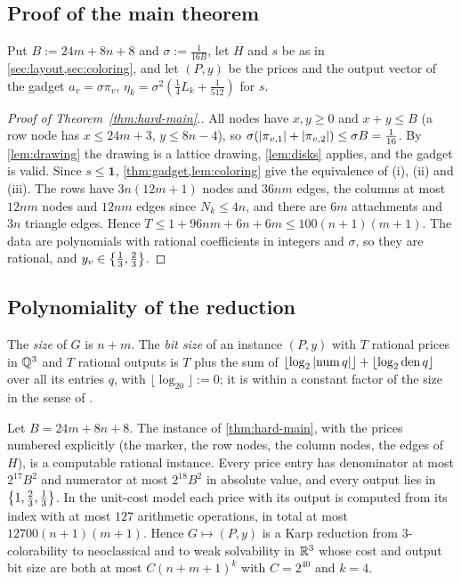\subsection{Proof of the main theorem}\label{sec:hard-proof}

Put $B:=24m+8n+8$ and $\sigma:=\frac1{16B}$, let $H$ and $s$ be as in \cref{sec:layout,sec:coloring}, and let $(P,y)$ be the prices and the output vector of the gadget $a_v=\sigma\pi_v$, $\eta_k=\sigma^2(\frac14L_k+\frac1{512})$ for $s$.

\begin{proof}[Proof of Theorem~\ref{thm:hard-main}.]
All nodes have $x,y\ge0$ and $x+y\le B$ (a row node has $x\le24m+3$, $y\le8n-4$), so $\sigma(\left\lvert \pi_{v,1} \right\rvert+\left\lvert \pi_{v,2} \right\rvert)\le\sigma B=\frac1{16}$. By \cref{lem:drawing} the drawing is a lattice drawing, \cref{lem:disks} applies, and the gadget is valid. Since $s\le\mathbf 1$, \cref{thm:gadget,lem:coloring} give the equivalence of (i), (ii) and (iii). The rows have $3n(12m+1)$ nodes and $36nm$ edges, the columns at most $12nm$ nodes and $12nm$ edges since $N_k\le4n$, and there are $6m$ attachments and $3n$ triangle edges. Hence $T\le1+96nm+6n+6m\le100(n+1)(m+1)$. The data are polynomials with rational coefficients in integers and $\sigma$, so they are rational, and $y_v\in\left\{ \frac13,\frac23 \right\}$.
\end{proof}

\subsection{Polynomiality of the reduction}\label{sec:hard-poly}

The \emph{size} of $G$ is $n+m$. The \emph{bit size} of an instance $(P,y)$ with $T$ rational prices in $\mathbb{Q}^3$ and $T$ rational outputs is $T$ plus the sum of $\lfloor\log_2\left\lvert \mathrm{num}\,q \right\rvert\rfloor+\lfloor\log_2\mathrm{den}\,q\rfloor$ over all its entries $q$, with $\lfloor\log_20\rfloor:=0$; it is within a constant factor of the size in the sense of \citet[\S2.1]{Schrijver1986}.

\begin{theorem}\label{thm:hard-karp}
Let $B=24m+8n+8$. The instance of \cref{thm:hard-main}, with the prices numbered explicitly (the marker, the row nodes, the column nodes, the edges of $H$), is a computable rational instance. Every price entry has denominator at most $2^{17}B^2$ and numerator at most $2^{18}B^2$ in absolute value, and every output lies in $\left\{ 1,\frac23,\frac13 \right\}$. In the unit-cost model each price with its output is computed from its index with at most $127$ arithmetic operations, in total at most $12700(n+1)(m+1)$. Hence $G\mapsto(P,y)$ is a Karp reduction from 3-colorability to neoclassical and to weak solvability in $\mathbb{R}^3$ whose cost and output bit size are both at most $C(n+m+1)^k$ with $C=2^{40}$ and $k=4$.
\end{theorem}

